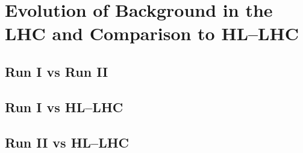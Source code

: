 \section{Evolution of Background in the LHC and Comparison to HL--LHC}
\subsection{Run I vs Run II}
\subsection{Run I vs HL--LHC}
\subsection{Run II vs HL--LHC}

